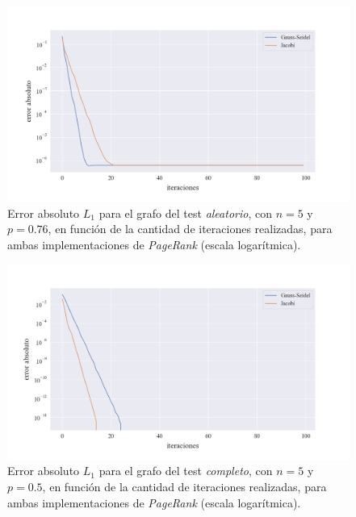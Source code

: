 \begin{figure}[!htbp]
    \centering
    \includegraphics[width=1\textwidth]{files/src/.media/convergencia_test_aleatorio.png}
    \caption{Error absoluto $L_1$ para el grafo del test \textit{aleatorio}, con $n = 5$ y $p = 0.76$, en función de la cantidad de iteraciones realizadas, para ambas implementaciones de \textit{PageRank} (escala logarítmica).} \label{test_aleatorio}
\end{figure}

\begin{figure}[!htbp]
    \centering
    \includegraphics[width=1\textwidth]{files/src/.media/convergencia_test_completo.png}
    \caption{Error absoluto $L_1$ para el grafo del test \textit{completo}, con $n = 5$ y $p = 0.5$, en función de la cantidad de iteraciones realizadas, para ambas implementaciones de \textit{PageRank} (escala logarítmica).} \label{test_completo}
\end{figure}

